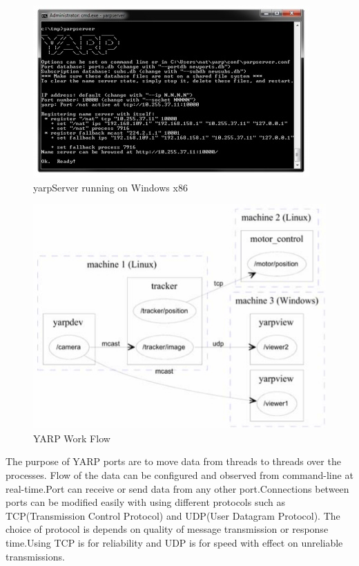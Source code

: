 \documentclass[12pt]{report}
\begin{document}
\begin{figure}[!h]
\begin{center}
\includegraphics[scale=1.0]{yarpServer.jpg}
\caption{yarpServer running on Windows x86}
\end{center}
\end{figure}

\begin{figure}[!h]
\begin{center}
\includegraphics[scale=0.4]{network.jpg}
\caption{YARP Work Flow}
\end{center}
\end{figure}
The purpose of YARP ports are to move data from threads to threads over the processes. Flow of the data can be configured and observed from command-line at real-time.Port can receive or send data from any other port.Connections between ports can be modified easily with using different protocols such as TCP(Transmission Control Protocol) and UDP(User Datagram Protocol). The choice of protocol is depends on quality of message transmission or response time.Using TCP is for reliability and UDP is for speed with effect on unreliable transmissions.
\newpage
\end{document}
